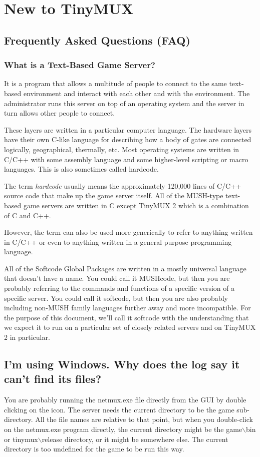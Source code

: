 \documentclass[10pt,letterpaper]{book}
\begin{document}
\chapter{New to TinyMUX}
\section{Frequently Asked Questions (FAQ)}
\subsection{What is a Text-Based Game Server?}
It is a program that allows a multitude of people to connect to the same
text-based environment and interact with each other and with the environment.
The administrator runs this server on top of an operating system and the server
in turn allows other people to connect. %

These layers are written in a particular computer language. The hardware
layers have their own C-like language for describing how a body of gates are
connected logically, geographical, thermally, etc.  Most operating systems are
written in C/C++ with some assembly language and some higher-level scripting
or macro languages. This is also sometimes called hardcode.

The term \emph{hardcode} usually means the approximately 120,000 lines of C/C++
source code that make up the game server itself.
All of the MUSH-type text-based game servers are written in C except
TinyMUX 2 which is a combination of C and C++.

However, the term can also be used more generically to refer to anything
written in C/C++ or even to anything written in a general purpose programming
language.

All of the Softcode Global Packages are written in a mostly universal language
that doesn't have a name. You could call it MUSHcode, but then you are probably
referring to the commands and functions of a specific version of a specific
server. You could call
it softcode, but then you are also probably including non-MUSH family languages
further away and more incompatible. For the purpose of this document, we'll
call it softcode with the understanding that we expect it to run on a particular
set of closely related servers and on TinyMUX 2 in particular.

\section{I'm using Windows. Why does the log say it can't find its files?}
You are probably running the netmux.exe file directly from the GUI by double
clicking on the icon. The server needs the current directory to be the game
sub-directory. All the file names are relative to that point, but when you
double-click on the netmux.exe program directly, the current directory might
be the game$\backslash$bin or tinymux$\backslash$release directory, or it
might be somewhere else.  The current directory is too undefined for the game
to be run this way.
\end{document}
